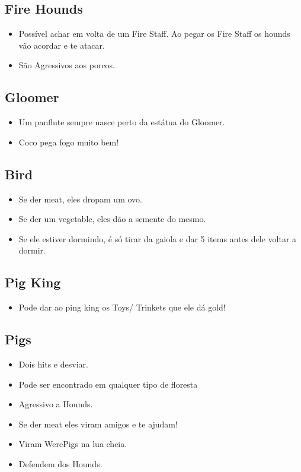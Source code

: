 \documentclass{article}
\begin{document}
\subsection*{Fire Hounds}
\begin{itemize}
    \item Possível achar em volta de um Fire Staff. Ao pegar os Fire Staff os hounds vão acordar e te atacar.
    \item São Agressivos aos porcos.
\end{itemize}


\subsection*{Gloomer}
\begin{itemize}
    \item Um panflute sempre nasce perto da estátua do Gloomer.
    \item Coco pega fogo muito bem!
\end{itemize}


\subsection*{Bird}
\begin{itemize}
    \item Se der meat, eles dropam um ovo.
    \item Se der um vegetable, eles dão a semente do mesmo.
    \item Se ele estiver dormindo, é só tirar da gaiola e dar 5 items antes dele voltar a dormir.
\end{itemize}

\subsection*{Pig King}
\begin{itemize}
    \item Pode dar ao ping king os Toys/ Trinkets que ele dá gold!
\end{itemize}


\subsection*{Pigs}
\begin{itemize}
    \item Dois hits e desviar. 
    \item Pode ser encontrado em qualquer tipo de floresta 
    \item Agressivo a Hounds.
    \item Se der meat eles viram amigos e te ajudam!
    \item Viram WerePigs na lua cheia.
    \item Defendem dos Hounds.
\end{itemize}
\end{document}
